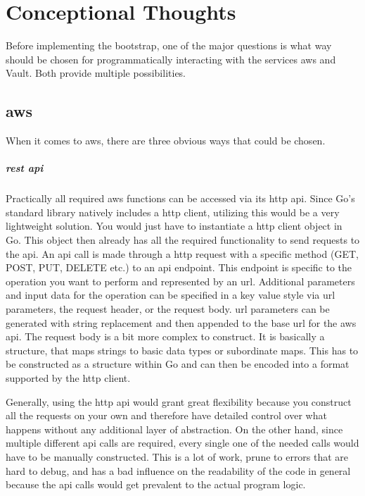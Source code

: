 \chapter{Conceptional Thoughts}
Before implementing the bootstrap, one of the major questions is what way should be chosen for programmatically interacting with the services \ac{aws} and Vault.
Both provide multiple possibilities.

\section{\ac{aws}}
When it comes to \ac{aws}, there are three obvious ways that could be chosen.

\paragraph{\acs{rest} \ac{api}}
Practically all required \ac{aws} functions can be accessed via its \ac{http} \ac{api}.
Since Go's standard library natively includes a \ac{http} client, utilizing this would be a very lightweight solution.
You would just have to instantiate a \ac{http} client object in Go.
This object then already has all the required functionality to send requests to the \ac{api}.
An \ac{api} call is made through a \ac{http} request with a specific method (GET, POST, PUT, DELETE etc.) to an \ac{api} endpoint.
This endpoint is specific to the operation you want to perform and represented by an \ac{url}.
Additional parameters and input data for the operation can be specified in a key value style via \ac{url} parameters, the request header, or the request body.
\ac{url} parameters can be generated with string replacement and then appended to the base \ac{url} for the \ac{aws} \ac{api}.
The request body is a bit more complex to construct.
It is basically a structure, that maps strings to basic data types or subordinate maps.
This has to be constructed as a structure within Go and can then be encoded into a format supported by the \ac{http} client.

Generally, using the \ac{http} \ac{api} would grant great flexibility because you construct all the requests on your own and therefore have detailed control over what happens without any additional layer of abstraction.
On the other hand, since multiple different \ac{api} calls are required, every single one of the needed calls would have to be manually constructed.
This is a lot of work, prune to errors that are hard to debug, and has a bad influence on the readability of the code in general because the \ac{api} calls would get prevalent to the actual program logic.

